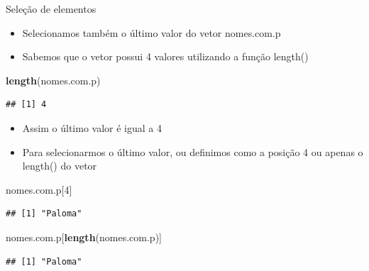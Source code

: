 \documentclass[
  10pt,
  ignorenonframetext,
]{beamer}
\newenvironment{Shaded}{\begin{snugshade}}{\end{snugshade}}
\newcommand{\DecValTok}[1]{\textcolor[rgb]{0.00,0.00,0.81}{#1}}
\newcommand{\KeywordTok}[1]{\textcolor[rgb]{0.13,0.29,0.53}{\textbf{#1}}}
\newcommand{\NormalTok}[1]{#1}
\providecommand{\tightlist}{%
  \setlength{\itemsep}{0pt}\setlength{\parskip}{0pt}}
\begin{document}
\begin{frame}[fragile]{Seleção de elementos}
\protect\hypertarget{seleuxe7uxe3o-de-elementos-4}{}
\begin{itemize}
\tightlist
\item
  Selecionamos também o último valor do vetor nomes.com.p
\item
  Sabemos que o vetor possui 4 valores utilizando a função length()
\end{itemize}

\begin{Shaded}
\begin{Highlighting}[]
\KeywordTok{length}\NormalTok{(nomes.com.p)}
\end{Highlighting}
\end{Shaded}

\begin{verbatim}
## [1] 4
\end{verbatim}

\begin{itemize}
\tightlist
\item
  Assim o último valor é igual a 4
\item
  Para selecionarmos o último valor, ou definimos como a posição 4 ou
  apenas o length() do vetor
\end{itemize}

\begin{Shaded}
\begin{Highlighting}[]
\NormalTok{nomes.com.p[}\DecValTok{4}\NormalTok{]}
\end{Highlighting}
\end{Shaded}

\begin{verbatim}
## [1] "Paloma"
\end{verbatim}

\begin{Shaded}
\begin{Highlighting}[]
\NormalTok{nomes.com.p[}\KeywordTok{length}\NormalTok{(nomes.com.p)]}
\end{Highlighting}
\end{Shaded}

\begin{verbatim}
## [1] "Paloma"
\end{verbatim}
\end{frame}
\end{document}
